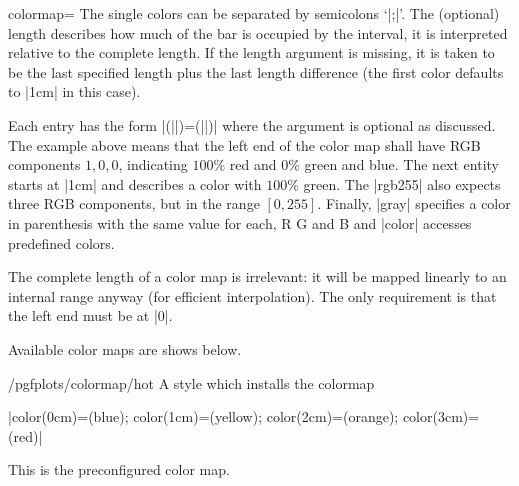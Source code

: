 \begin{pgfplotskey}{colormap=}
\noindent The single colors can be separated by semicolons `|;|'. The (optional) length describes how much of the bar is occupied by the interval, it is interpreted relative to the complete length. If the length argument is missing, it is taken to be the last specified length plus the last length difference (the first color defaults to |1cm| in this case). 

Each entry has the form |(||)=(||)| where the  argument is optional as discussed. The example above means that the left end of the color map shall have RGB components $1,0,0$, indicating $100\%$ red and $0\%$ green and blue. The next entity starts at |1cm| and describes a color with $100\%$ green. The |rgb255| also expects three RGB components, but in the range $[0,255]$. Finally, |gray| specifies a color in parenthesis with the same value for each, R G and B and |color| accesses predefined colors.

\begin{codeexample}[]
\end{codeexample}
The complete length of a color map is irrelevant: it will be mapped linearly to an internal range anyway (for efficient interpolation). The only requirement is that the left end must be at |0|.

Available color maps are shows below.

\end{pgfplotskey}

\begin{stylekey}{/pgfplots/colormap/hot}
	A style which installs the colormap

	|{color(0cm)=(blue); color(1cm)=(yellow); color(2cm)=(orange); color(3cm)=(red)}|


	This is the preconfigured color map.
\end{stylekey}

